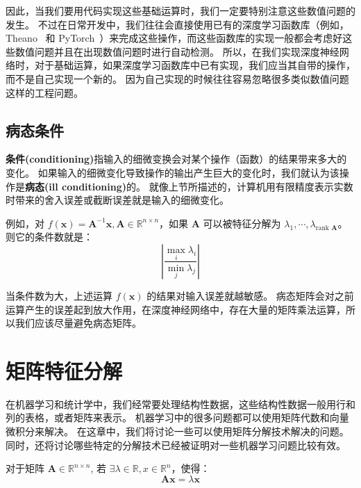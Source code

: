 因此，当我们要用代码实现这些基础运算时，我们一定要特别注意这些数值问题的发生。
不过在日常开发中，我们往往会直接使用已有的深度学习函数库（例如，Theano~\cite{theano} 和 PyTorch~\cite{pytorch}）来完成这些操作，而这些函数库的实现一般都会考虑好这些数值问题并且在出现数值问题时进行自动检测。
所以，在我们实现深度神经网络时，对于基础运算，如果深度学习函数库中已有实现，我们应当其自带的操作，而不是自己实现一个新的。
因为自己实现的时候往往容易忽略很多类似数值问题这样的工程问题。

\section{病态条件}
\textbf{条件(conditioning)}指输入的细微变换会对某个操作（函数）的结果带来多大的变化。
如果输入的细微变化导致操作的输出产生巨大的变化时，我们就认为该操作是\textbf{病态(ill conditioning)}的。
就像上节所描述的，计算机用有限精度表示实数时带来的舍入误差或截断误差就是输入的细微变化。

例如，对 $f(\bm{x}) = \bm{A}^{-1} \bm{x}, \bm{A} \in \mathbb{R}^{n \times n}$，如果 $\bm{A}$ 可以被特征分解为 $\lambda_1, \cdots, \lambda_{\text{rank } \bm{A}}$。
则它的条件数就是：
\begin{equation}
	\left|\frac{\max_{i} \lambda_i}{\min_j \lambda_j}\right|
\end{equation}

当条件数为大，上述运算 $f(\bm{x})$ 的结果对输入误差就越敏感。
病态矩阵会对之前运算产生的误差起到放大作用，在深度神经网络中，存在大量的矩阵乘法运算，所以我们应该尽量避免病态矩阵。


\chapter{矩阵特征分解}
\label{chap:matrix_decom}
在机器学习和统计学中，我们经常要处理结构性数据，这些结构性数据一般用行和列的表格，或者矩阵来表示。
机器学习中的很多问题都可以使用矩阵代数和向量微积分来解决。
在这章中，我们将讨论一些可以使用矩阵分解技术解决的问题。
同时，还将讨论哪些特定的分解技术已经被证明对一些机器学习问题比较有效。

对于矩阵 $\bm{A} \in \mathbb{R}^{n \times n}$, 若 $\exists \lambda \in \mathbb{R}, x \in \mathbb{R}^n$，使得：
\begin{equation}
	\bm{Ax} = \lambda \bm{x}
\end{equation}

